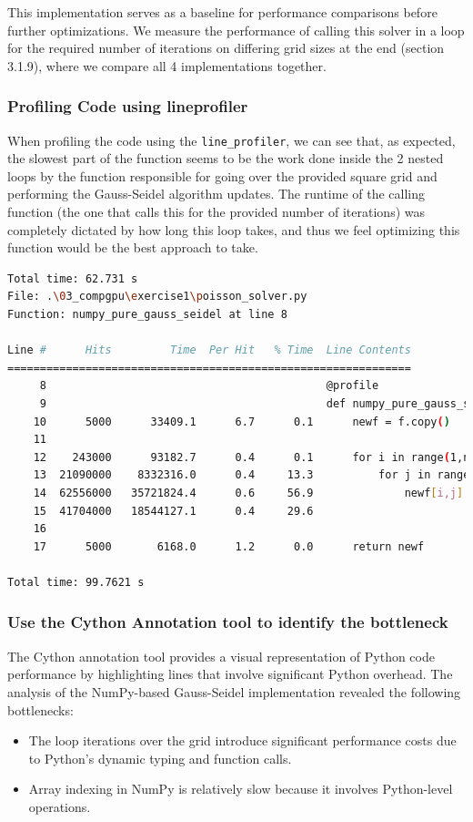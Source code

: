 \documentclass[a4paper,12pt]{article}
\begin{document}
This implementation serves as a baseline for performance comparisons before further optimizations. We measure the performance of calling this solver in a loop for the required number of iterations on differing grid sizes at the end (section 3.1.9), where we compare all 4 implementations together. 

\subsubsection{Profiling Code using lineprofiler}
When profiling the code using the \verb|line_profiler|, we can see that, as expected, the slowest part of the function seems to be the work done inside the 2 nested loops by the function responsible for going over the provided square grid and performing the Gauss-Seidel algorithm updates. The runtime of the calling function (the one that calls this for the provided number of iterations) was completely dictated by how long this loop takes, and thus we feel optimizing this function would be the best approach to take.
 
\begin{lstlisting}[language=bash,basicstyle=\tiny\ttfamily]
Total time: 62.731 s
File: .\03_compgpu\exercise1\poisson_solver.py
Function: numpy_pure_gauss_seidel at line 8

Line #      Hits         Time  Per Hit   % Time  Line Contents
==============================================================
     8                                           @profile
     9                                           def numpy_pure_gauss_seidel(f):
    10      5000      33409.1      6.7      0.1      newf = f.copy()
    11
    12    243000      93182.7      0.4      0.1      for i in range(1,newf.shape[0]-1):
    13  21090000    8332316.0      0.4     13.3          for j in range(1,newf.shape[1]-1):
    14  62556000   35721824.4      0.6     56.9              newf[i,j] = 0.25 * (newf[i,j+1] + newf[i,j-1] +
    15  41704000   18544127.1      0.4     29.6                                  newf[i+1,j] + newf[i-1,j])
    16
    17      5000       6168.0      1.2      0.0      return newf

Total time: 99.7621 s
\end{lstlisting}


\subsubsection{Use the Cython Annotation tool to identify the bottleneck}
The Cython annotation tool provides a visual representation of Python code performance by highlighting lines that involve significant Python overhead. The analysis of the NumPy-based Gauss-Seidel implementation revealed the following bottlenecks:
\begin{itemize}
    \item{The loop iterations over the grid introduce significant performance costs due to Python's dynamic typing and function calls.}
    \item{Array indexing in NumPy is relatively slow because it involves Python-level operations.}
\end{itemize}
\end{document}
